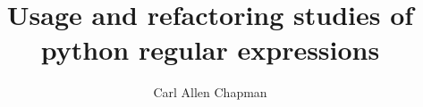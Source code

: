 \title{Usage and refactoring studies of python regular expressions}
\author{Carl Allen Chapman}
\notice
\maketitle
